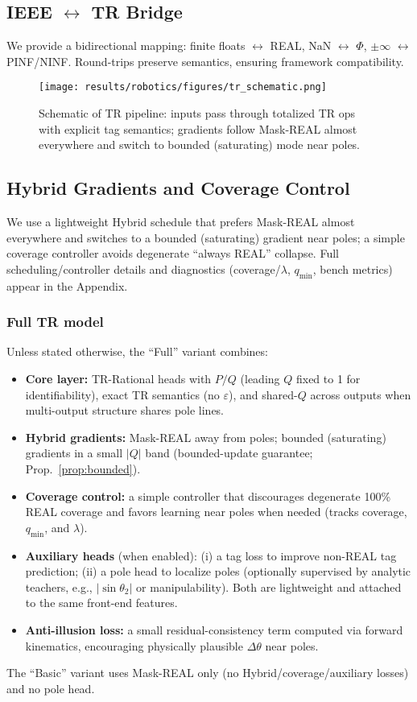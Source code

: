 \documentclass[11pt,twoside]{article}
\begin{document}
\subsection{IEEE \texorpdfstring{$\leftrightarrow$}{↔} TR Bridge}
We provide a bidirectional mapping: finite floats $\leftrightarrow$ REAL, NaN $\leftrightarrow$ $\Phi$, $\pm\infty$ $\leftrightarrow$ PINF/NINF. Round-trips preserve semantics, ensuring framework compatibility.
\begin{figure}[h]
  \centering
  \texttt{[image: results/robotics/figures/tr\_schematic.png]}
  \caption{Schematic of TR pipeline: inputs pass through totalized TR ops with explicit tag semantics; gradients follow Mask-REAL almost everywhere and switch to bounded (saturating) mode near poles.}
\end{figure}



\subsection{Hybrid Gradients and Coverage Control}
We use a lightweight Hybrid schedule that prefers Mask-REAL almost everywhere and switches to a bounded (saturating) gradient near poles; a simple coverage controller avoids degenerate ``always REAL'' collapse. Full scheduling/controller details and diagnostics (coverage/$\lambda$, $q_{\min}$, bench metrics) appear in the Appendix.

\subsubsection{Full TR model}

Unless stated otherwise, the ``Full'' variant combines:
\begin{itemize}
  \item \textbf{Core layer:} TR-Rational heads with $P/Q$ (leading $Q$ fixed to 1 for identifiability), exact TR semantics (no $\varepsilon$), and shared-$Q$ across outputs when multi-output structure shares pole lines.
  \item \textbf{Hybrid gradients:} Mask-REAL away from poles; bounded (saturating) gradients in a small $|Q|$ band (bounded-update guarantee; Prop.~\ref{prop:bounded}).
  \item \textbf{Coverage control:} a simple controller that discourages degenerate 100\% REAL coverage and favors learning near poles when needed (tracks coverage, $q_{\min}$, and $\lambda$).
  \item \textbf{Auxiliary heads} (when enabled): (i) a tag loss to improve non-REAL tag prediction; (ii) a pole head to localize poles (optionally supervised by analytic teachers, e.g., $|\sin\theta_2|$ or manipulability). Both are lightweight and attached to the same front-end features.
  \item \textbf{Anti-illusion loss:} a small residual-consistency term computed via forward kinematics, encouraging physically plausible $\Delta\theta$ near poles.
\end{itemize}
The ``Basic'' variant uses Mask-REAL only (no Hybrid/coverage/auxiliary losses) and no pole head.
\end{document}
